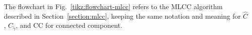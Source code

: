 \documentclass[lettersize,journal]{IEEEtran}
\begin{document}


The flowchart in Fig.~\ref{tikz:flowchart-mlcc} refers to the MLCC algorithm described in Section~\ref{section:mlcc}, keeping the same notation and meaning for $\hat{C}$, $C_{\tilde{\gamma}}$, and CC for connected component.
\end{document}
